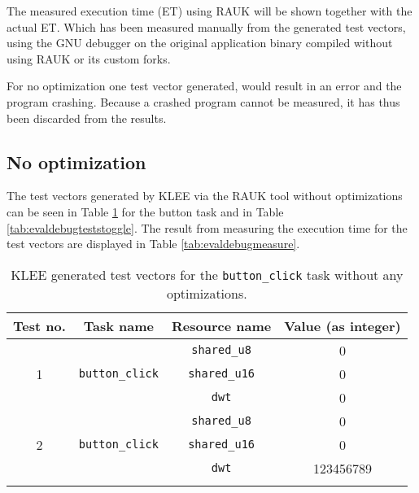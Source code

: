 The measured execution time (ET) using RAUK will be shown together with the
actual ET.  Which has been measured manually from the generated test vectors,
using the GNU debugger on the original application binary compiled without
using RAUK or its custom forks.

For no optimization one test vector generated, would result in an error and the
program crashing. Because a crashed program cannot be measured, it has thus
been discarded from the results.

\subsection{No optimization}
The test vectors generated by KLEE via the RAUK tool without optimizations can
be seen in Table \ref{tab:evaldebugtestsbutton} for the button task and in
Table \ref{tab:evaldebugteststoggle}. The result from measuring the execution
time for the test vectors are displayed in Table \ref{tab:evaldebugmeasure}.

\begin{longtable}{|c|c|c|c|}
\hline
Test no. & Task name & Resource name & Value (as integer) \\ \hline
\multirow{3}{*}{1} & \multirow{3}{*}{\texttt{button\_click}} & \texttt{shared\_u8}  & 0 \\ \cline{3-4} 
                   &                                         & \texttt{shared\_u16} & 0 \\ \cline{3-4} 
                   &                                         & \texttt{dwt}         & 0 \\ \hline
\multirow{3}{*}{2} & \multirow{3}{*}{\texttt{button\_click}} & \texttt{shared\_u8}  & 0 \\ \cline{3-4} 
                   &                                         & \texttt{shared\_u16} & 0 \\ \cline{3-4} 
                   &                                         & \texttt{dwt}         & 123456789 \\ \hline

\caption{KLEE generated test vectors for the \texttt{button\_click} task without any optimizations.}
\label{tab:evaldebugtestsbutton}
\end{longtable}

